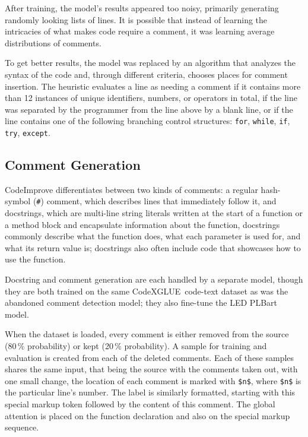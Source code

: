             After training, the model's results appeared too noisy, primarily generating randomly looking lists of lines. It is possible that instead of learning the intricacies of what makes code require a comment, it was learning average distributions of comments.
            
            \medskip
            
            To get better results, the model was replaced by an algorithm that analyzes the syntax of the code and, through different criteria, chooses places for comment insertion. The heuristic evaluates a line as needing a comment if it contains more than 12 instances of unique identifiers, numbers, or operators in total, if the line was separated by the programmer from the line above by a blank line, or if the line contains one of the following branching control structures: \texttt{for}, \texttt{while}, \texttt{if}, \texttt{try}, \texttt{except}.
            
        \subsection{Comment Generation}
            CodeImprove differentiates between two kinds of comments: a regular hash-symbol (\texttt{\#}) comment, which describes lines that immediately follow it, and docstrings, which are multi-line string literals written at the start of a function or a method block and encapsulate information about the function, docstrings commonly describe what the function does, what each parameter is used for, and what its return value is; docstrings also often include code that showcases how to use the function.
            
            Docstring and comment generation are each handled by a separate model, though they are both trained on the same CodeXGLUE\,\cite{codexglue} code-text dataset as was the abandoned comment detection model; they also fine-tune the LED PLBart model. 
            
            \medskip
            
            When the dataset is loaded, every comment is either removed from the source (80\,\% probability) or kept (20\,\% probability). A sample for training and evaluation is created from each of the deleted comments. Each of these samples shares the same input, that being the source with the comments taken out, with one small change, the location of each comment is marked with \texttt{\$n\$}, where \texttt{\$n\$} is the particular line's number. The label is similarly formatted, starting with this special markup token followed by the content of this comment. The global attention is placed on the function declaration and also on the special markup sequence.

